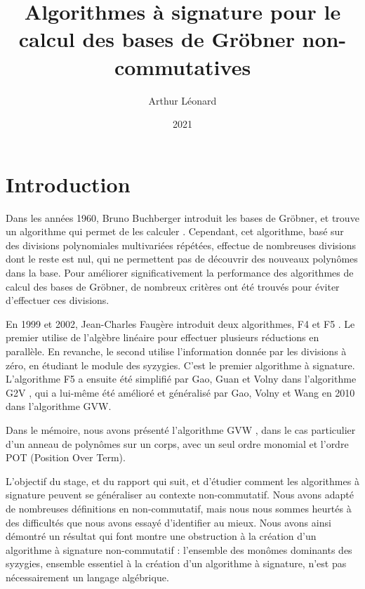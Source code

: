 \documentclass{article}
\title{Algorithmes à signature pour le calcul des bases de Gröbner non-commutatives}
\author{Arthur Léonard}
\date{2021}
\begin{document}
\maketitle

\section*{Introduction}
Dans les années 1960, Bruno Buchberger introduit les bases de Gröbner, et trouve un algorithme qui permet de les calculer \cite{buchberger}. Cependant, cet algorithme, basé sur des divisions polynomiales multivariées répétées, effectue de nombreuses divisions dont le reste est nul, qui ne permettent pas de découvrir des nouveaux polynômes dans la base. Pour améliorer significativement la performance des algorithmes de calcul des bases de Gröbner, de nombreux critères ont été trouvés pour éviter d'effectuer ces divisions.

En 1999 et 2002, Jean-Charles Faugère introduit deux algorithmes, F4 \cite{f4} et F5 \cite{f5}. Le premier utilise de l'algèbre linéaire pour effectuer plusieurs réductions en parallèle. En revanche, le second utilise l'information donnée par les divisions à zéro, en étudiant le module des syzygies. C'est le premier algorithme à signature. L'algorithme F5 a ensuite été simplifié par Gao, Guan et Volny dans l'algorithme G2V \cite{g2v}, qui a lui-même été amélioré et généralisé par Gao, Volny et Wang en 2010 dans l'algorithme GVW.

Dans le mémoire, nous avons présenté l'algorithme GVW \cite{gvw}, dans le cas particulier d'un anneau de polynômes sur un corps, avec un seul ordre monomial et l'ordre POT (Position Over Term).

L'objectif du stage, et du rapport qui suit, et d'étudier comment les algorithmes à signature peuvent se généraliser au contexte non-commutatif. Nous avons adapté de nombreuses définitions en non-commutatif, mais nous nous sommes heurtés à des difficultés que nous avons essayé d'identifier au mieux. Nous avons ainsi démontré un résultat qui font montre une obstruction à la création d'un algorithme à signature non-commutatif : l'ensemble des monômes dominants des syzygies, ensemble essentiel à la création d'un algorithme à signature, n'est pas nécessairement un langage algébrique.
\end{document}
